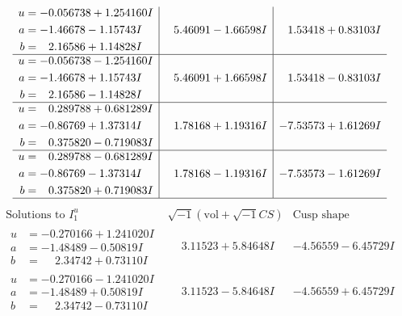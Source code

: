 \documentclass[1p]{elsarticle_modified}
\theoremstyle{definition}
\newcommand{\I}{\sqrt{-1}}
\begin{document}
$$\begin{array}{c|c|c}
\begin{aligned}
u &= -0.056738 + 1.254160 I \\
a &= -1.46678 - 1.15743 I \\
b &= \phantom{-}2.16586 + 1.14828 I\end{aligned}
 & \phantom{-}5.46091 - 1.66598 I & \phantom{-}1.53418 + 0.83103 I \\ \hline\begin{aligned}
u &= -0.056738 - 1.254160 I \\
a &= -1.46678 + 1.15743 I \\
b &= \phantom{-}2.16586 - 1.14828 I\end{aligned}
 & \phantom{-}5.46091 + 1.66598 I & \phantom{-}1.53418 - 0.83103 I \\ \hline\begin{aligned}
u &= \phantom{-}0.289788 + 0.681289 I \\
a &= -0.86769 + 1.37314 I \\
b &= \phantom{-}0.375820 - 0.719083 I\end{aligned}
 & \phantom{-}1.78168 + 1.19316 I & -7.53573 + 1.61269 I \\ \hline\begin{aligned}
u &= \phantom{-}0.289788 - 0.681289 I \\
a &= -0.86769 - 1.37314 I \\
b &= \phantom{-}0.375820 + 0.719083 I\end{aligned}
 & \phantom{-}1.78168 - 1.19316 I & -7.53573 - 1.61269 I\\
 \hline 
 \end{array}$$\newpage$$\begin{array}{c|c|c}  
\text{Solutions to }I^u_{1}& \I (\text{vol} + \sqrt{-1}CS) & \text{Cusp shape}\\
 \hline 
\begin{aligned}
u &= -0.270166 + 1.241020 I \\
a &= -1.48489 - 0.50819 I \\
b &= \phantom{-}2.34742 + 0.73110 I\end{aligned}
 & \phantom{-}3.11523 + 5.84648 I & -4.56559 - 6.45729 I \\ \hline\begin{aligned}
u &= -0.270166 - 1.241020 I \\
a &= -1.48489 + 0.50819 I \\
b &= \phantom{-}2.34742 - 0.73110 I\end{aligned}
 & \phantom{-}3.11523 - 5.84648 I & -4.56559 + 6.45729 I \\ \hline\begin{aligned}

\end{aligned}
\end{array}$$
\end{document}
